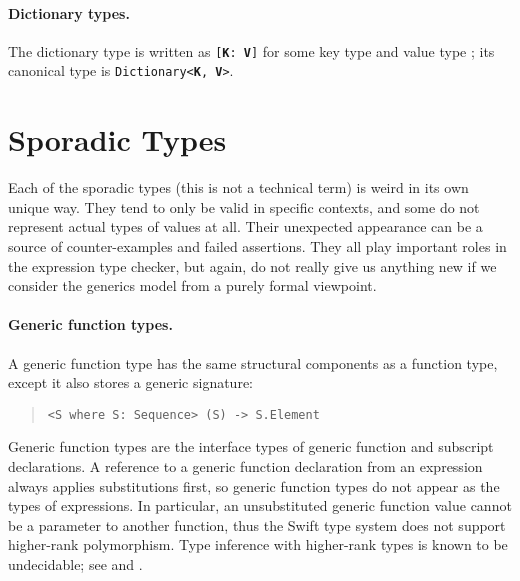 \documentclass[../generics]{subfiles}
\begin{document}
\paragraph{Dictionary types.} The dictionary type is written as \texttt{[\textbf{K}: \textbf{V}]} for some key type  and value type ; its canonical type is \texttt{Dictionary<\textbf{K}, \textbf{V}>}.

\section{Sporadic Types}\label{misc types}

Each of the sporadic types (this is not a technical term) is weird in its own unique way. They tend to only be valid in specific contexts, and some do not represent actual types of values at all. Their unexpected appearance can be a source of counter-examples and failed assertions. They all play important roles in the expression type checker, but again, do not really give us anything new if we consider the generics model from a purely formal viewpoint.

\paragraph{Generic function types.}
A generic function type has the same structural components as a function type, except it also stores a generic signature:
\begin{quote}
\begin{verbatim}
<S where S: Sequence> (S) -> S.Element
\end{verbatim}
\end{quote}

Generic function types are the interface types of generic function and subscript declarations. A reference to a generic function declaration from an expression always applies substitutions first, so generic function types do not appear as the types of expressions. In particular, an unsubstituted generic function value cannot be a parameter to another function, thus the Swift type system does not support higher-rank polymorphism. Type inference with higher-rank types is known to be undecidable; see \cite{wells} and \cite{practicalhigherrank}.
\end{document}
